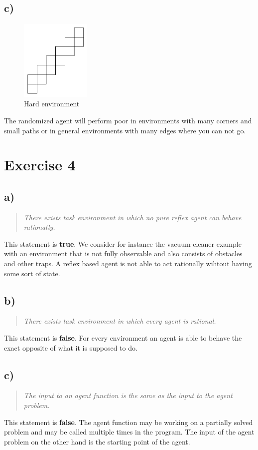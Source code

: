 \documentclass[11pt]{article}
\begin{document}
\subsection*{c)}

\begin{figure}[ht]
	\centering
  \includegraphics[width=0.3\textwidth]{environment}
	\caption{Hard environment}
	\label{fig:environment}
\end{figure}

\noindent The randomized agent will perform poor in environments with many corners and small paths or in general environments with many edges where you can not go.
\newpage
\section*{Exercise 4}
\subsection*{a)}
\begin{quotation}\noindent
\textit{There exists task environment in which no pure reflex agent can behave rationally.}
\end{quotation}
\noindent
This statement is \textbf{true}. We consider for instance the vacuum-cleaner example with an environment that is not fully observable and also consists of obstacles and other traps. A reflex based agent is not able to act rationally wihtout having some sort of state.

\subsection*{b)}
\begin{quotation}\noindent
\textit{There exists task environment in which every agent is rational.}
\end{quotation}
\noindent
This statement is \textbf{false}. For every environment an agent is able to behave the exact opposite of what it is supposed to do.

\subsection*{c)}
\begin{quotation}\noindent
\textit{The input to an agent function is the same as the input to the agent problem.}
\end{quotation}
\noindent
This statement is \textbf{false}. The agent function may be working on a partially solved problem and may be called multiple times in the program. The input of the agent problem on the other hand is the starting point of the agent.
\end{document}
